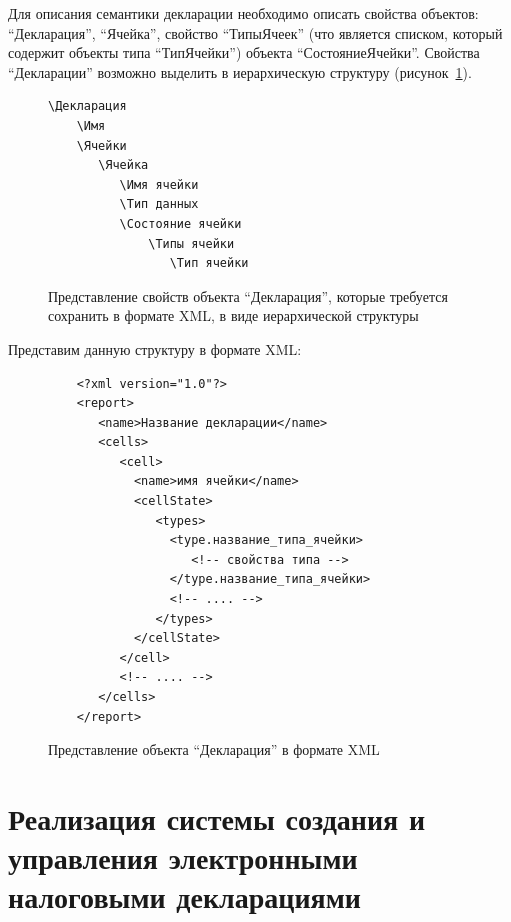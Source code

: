 \documentclass[14pt,a4paper]{reportmod}
\begin{document}
Для описания семантики декларации необходимо описать свойства объектов: ``Декларация'', ``Ячейка'', свойство ``ТипыЯчеек'' (что является списком, который содержит объекты типа ``ТипЯчейки'') объекта ``СостояниеЯчейки''. Свойства ``Декларации'' возможно выделить в иерархическую структуру (рисунок~\ref{pic:report_hierarchy}).
\begin{figure}
\begin{verbatim}
\Декларация
    \Имя
    \Ячейки
       \Ячейка
          \Имя ячейки
          \Тип данных
          \Состояние ячейки
              \Типы ячейки
                 \Тип ячейки
\end{verbatim}
\caption{Представление свойств объекта ``Декларация'', которые требуется сохранить в формате XML, в виде иерархической структуры}
\label{pic:report_hierarchy}
\end{figure}
Представим данную структуру в формате XML:
\begin{figure}
  \begin{verbatim}
    <?xml version="1.0"?>
    <report>
       <name>Название декларации</name>
       <cells>
          <cell>
            <name>имя ячейки</name>
            <cellState>
               <types>
                 <type.название_типа_ячейки>
                    <!-- свойства типа -->
                 </type.название_типа_ячейки>
                 <!-- .... -->
               </types>
            </cellState>
          </cell>
          <!-- .... -->
       </cells>
    </report>
  \end{verbatim}
  \caption{Представление объекта ``Декларация'' в формате XML}
\end{figure}

\chapter{Реализация системы создания и управления электронными налоговыми декларациями}
\end{document}
